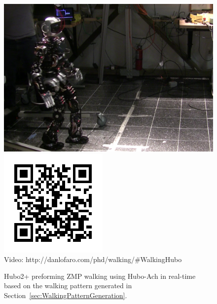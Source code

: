 


\begin{figure}[thpb]
  \centering
\includegraphics[width=0.6\columnwidth]{./examples/pix/hubo-walking.png}
\includegraphics[width=0.3\columnwidth]{./qrcode/qrcode-hubo-walking.png}\\
      Video: http://danlofaro.com/phd/walking/\#WalkingHubo
  \caption{Hubo2+ preforming ZMP walking using Hubo-Ach in real-time based on the walking pattern generated in Section~\ref{sec:WalkingPatternGeneration}.}
  \label{fig:RealHuboWalkingVideo}
\end{figure}

